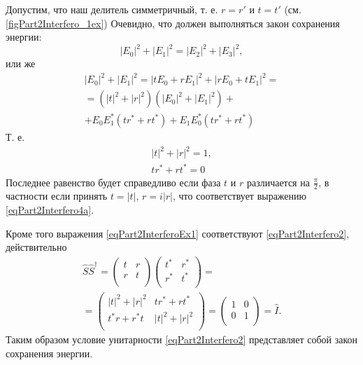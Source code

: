 \begin{example}
  
  
  Допустим, что наш делитель симметричный, т. е. $r=r'$ и $t = t'$
  (см. \autoref{figPart2Interfero_1ex})
  Очевидно, что должен выполняться закон сохранения энергии:
  \[
  \left|E_0\right|^2 + \left|E_1\right|^2 =
  \left|E_2\right|^2 + \left|E_3\right|^2, 
  \]
  или же
  \begin{eqnarray}
    \left|E_0\right|^2 + \left|E_1\right|^2 =
    \left|t E_0 + r E_1\right|^2 + \left|r E_0 + t E_1\right|^2 =
    \nonumber \\
    =
    \left(\left|t\right|^2 + \left|r\right|^2\right) 
    \left(\left|E_0\right|^2 + \left|E_1\right|^2\right) +
    \nonumber \\
    + E_0 E_1^\ast \left(t r^\ast + r t^\ast\right)
    + E_1 E_0^\ast \left(t r^\ast + r t^\ast\right)
    \nonumber
  \end{eqnarray}
  Т. е.
  \begin{eqnarray}
    \left|t\right|^2 + \left|r\right|^2 = 1,
    \nonumber \\
    t r^\ast + r t^\ast = 0
    \label{eqPart2InterferoEx1}
  \end{eqnarray}
  Последнее равенство будет справедливо если фаза $t$ и $r$
  различается на $\frac{\pi}{2}$, в частности если принять
  $t = \left|t\right|$, $r = i \left|r\right|$, что соответствует
  выражению \eqref{eqPart2Interfero4a}.

  Кроме того выражения \eqref{eqPart2InterferoEx1} соответствуют
  \eqref{eqPart2Interfero2}, действительно
  \begin{eqnarray}
    \hat{S} \hat{S}^{\dag} = 
    \left(
    \begin{array}{cc}
      t & r \\
      r & t \\      
    \end{array}
    \right)
    \left(
    \begin{array}{cc}
      t^{*} & r^{*} \\
      r^{*} & t^{*} \\      
    \end{array}
    \right) =
    \nonumber \\
    =
    \left(
    \begin{array}{cc}
      \left|t\right|^2 + \left|r\right|^2 & t r^\ast + r t^\ast \\
      t^\ast r + r^\ast t & \left|t\right|^2 + \left|r\right|^2 \\
    \end{array}
    \right) =
    \left(
    \begin{array}{cc}
      1 & 0 \\
      0 & 1 \\
    \end{array}
    \right) = \hat{I}.
    \nonumber
  \end{eqnarray}
  Таким образом условие унитарности \eqref{eqPart2Interfero2}
  представляет собой закон сохранения энергии.
\end{example}



